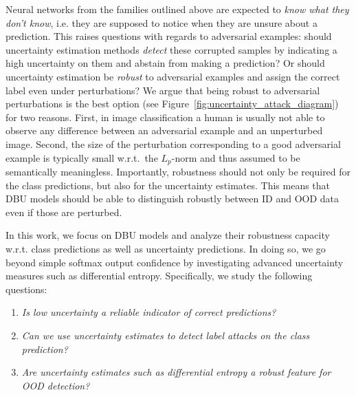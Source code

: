 Neural networks from the families outlined above are expected to \emph{know what they don't know}, i.e. they are supposed to notice when they are unsure about a prediction. 
This raises questions with regards to adversarial examples: should uncertainty estimation methods \emph{detect} these corrupted samples by indicating a high uncertainty on them and abstain from making a prediction? Or should uncertainty estimation be \emph{robust} to adversarial examples and assign the correct label even under perturbations? We argue that being robust to adversarial perturbations is the best option (see Figure~\ref{fig:uncertainty_attack_diagram}) for two reasons. First, in image classification a human is usually not able to observe any difference between an adversarial example and an unperturbed image. Second, the size of the perturbation corresponding to a good adversarial example is typically small w.r.t.\ the $L_p$-norm and thus assumed to be semantically meaningless. 
Importantly, robustness should not only be required for the class predictions, but also for the uncertainty estimates. This means that DBU models should be able to distinguish robustly between ID and OOD data even if those are perturbed. 

In this work, we focus on DBU models and analyze their robustness capacity w.r.t. class predictions as well as uncertainty predictions. In doing so, we go beyond simple softmax output confidence by investigating advanced uncertainty measures such as differential entropy.
Specifically, we study the following questions: 
%
\begin{enumerate}
    \item \emph{Is low uncertainty a reliable indicator of correct predictions?}
    \item \emph{Can we use uncertainty estimates to detect label attacks on the class prediction?}
    \item \emph{Are uncertainty estimates such as differential entropy a robust feature for OOD detection?}
\end{enumerate}


